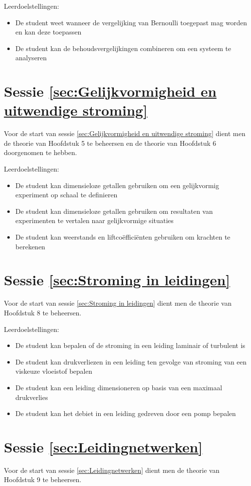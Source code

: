 Leerdoelstellingen:
\begin{itemize}
	\item De student weet wanneer de vergelijking van Bernoulli toegepast mag worden en kan deze toepassen
	\item De student kan de behoudsvergelijkingen combineren om een systeem te analyseren
\end{itemize}

	\section*{Sessie \ref{sec:Gelijkvormigheid en uitwendige stroming}}
Voor de start van sessie \ref{sec:Gelijkvormigheid en uitwendige stroming} dient men de theorie van Hoofdstuk 5 te beheersen en de theorie van Hoofdstuk 6 doorgenomen te hebben.

Leerdoelstellingen:
\begin{itemize}
	\item De student kan dimensieloze getallen gebruiken om een gelijkvormig experiment op schaal te definieren
	\item De student kan dimensieloze getallen gebruiken om resultaten van experimenten te vertalen naar gelijkvormige situaties
	\item De student kan weerstands en liftcoëfficiënten gebruiken om krachten te berekenen
\end{itemize}

	\section*{Sessie \ref{sec:Stroming in leidingen}}
Voor de start van sessie \ref{sec:Stroming in leidingen} dient men de theorie van Hoofdstuk 8 te beheersen.

Leerdoelstellingen:
\begin{itemize}
	\item De student kan bepalen of de stroming in een leiding laminair of turbulent is
	\item De student kan drukverliezen in een leiding ten gevolge van stroming van een viskeuze vloeistof bepalen
	\item De student kan een leiding dimensioneren op basis van een maximaal drukverlies
	\item De student kan het debiet in een leiding gedreven door een pomp bepalen
\end{itemize}

	\section*{Sessie \ref{sec:Leidingnetwerken}}
Voor de start van sessie \ref{sec:Leidingnetwerken} dient men de theorie van Hoofdstuk 9 te beheersen.

